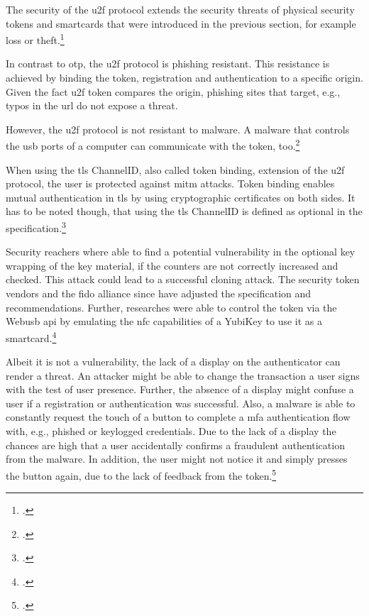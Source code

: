 The security of the \gls{u2f} protocol extends the security threats of physical security tokens and smartcards that were introduced in the previous section, for example loss or theft.\footcites[See][12--13]{fido-sec-ref}

In contrast to \gls{otp}, the \gls{u2f} protocol is phishing resistant. This resistance is achieved by binding the token, registration and authentication to a specific origin. Given the fact \gls{u2f} token compares the origin, phishing sites that target, e.g., typos in the \gls{url} do not expose a threat.

However, the \gls{u2f} protocol is not resistant to malware. A malware that controls the \gls{usb} ports of a computer can communicate with the token, too.\footcites[See][10--1]{8429292}[See][9]{u2f-overview}

When using the \gls{tls} ChannelID, also called token binding, extension of the \gls{u2f} protocol, the user is protected against \gls{mitm} attacks. Token binding enables mutual authentication in \gls{tls} by using cryptographic certificates on both sides. It has to be noted though, that using the \gls{tls} ChannelID is defined as optional in the specification.\footcites[See][6--7]{u2f-overview}

Security reachers where able to find a potential vulnerability in the optional key wrapping of the key material, if the counters are not correctly increased and checked. This attack could lead to a successful cloning attack. The security token vendors and the \gls{fido} alliance since have adjusted the specification and recommendations. Further, researches were able to control the token via the Web\gls{usb} \gls{api} by emulating the \gls{nfc} capabilities of a YubiKey to use it as a smartcard.\footcites[See][3]{DBLP:journals/corr/abs-1906-06009}

Albeit it is not a vulnerability, the lack of a display on the authenticator can render a threat. An attacker might be able to change the transaction a user signs with the test of user presence. Further, the absence of a display might confuse a user if a registration or authentication was successful. Also, a malware is able to constantly request the touch of a button to complete a \gls{mfa} authentication flow with, e.g., phished or keylogged credentials. Due to the lack of a display the chances are high that a user accidentally confirms a fraudulent authentication from the malware. In addition, the user might not notice it and simply presses the button again, due to the lack of feedback from the token.\footcites[See][434]{10.1007/978-3-662-54970-4_25}[See][15]{das2018johnny}[See][1518--1519]{238325}

